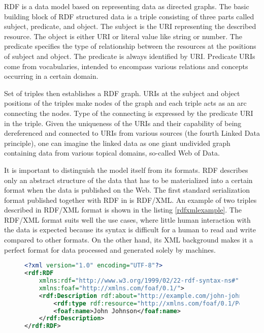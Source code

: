 RDF is a data model based on representing data as directed graphs. The basic building block of RDF structured data is a triple consisting of three parts called subject, predicate, and object. The subject is the URI representing the described resource. The object is either URI or literal value like string or number. The predicate specifies the type of relationship between the resources at the positions of subject and object. The predicate is always identified by URI. Predicate URIs come from vocabularies, intended to encompass various relations and concepts occurring in a certain domain.

Set of triples then establishes a RDF graph. URIs at the subject and object positions of the triples make nodes of the graph and each triple acts as an arc connecting the nodes. Type of the connecting is expressed by the predicate URI in the triple. Given the uniqueness of the URIs and their capability of being dereferenced and connected to URIs from various sources (the fourth Linked Data principle), one can imagine the linked data as one giant undivided graph containing data from various topical domains, so-called Web of Data.

It is important to distinguish the model itself from its formats. RDF describes only an abstract structure of the data that has to be materialized into a certain format when the data is published on the Web. The first standard serialization format published together with RDF in \cite{rdfPrimer2004} is RDF/XML. An example of two triples described in RDF/XML format is shown in the listing \ref{rdfxmlexample}. The RDF/XML format suits well the use cases, where little human interaction with the data is expected because its syntax is difficult for a human to read and write compared to other formats. On the other hand, its XML background makes it a perfect format for data processed and generated solely by machines.

\begin{figure}[h]
\begin{lstlisting}[language = XML, caption={Example of RDF data described in RDF/XML format}, label={rdfxmlexample},captionpos=b escapeinside={(*@}{@*)}]
<?xml version="1.0" encoding="UTF-8"?>
<rdf:RDF
    xmlns:rdf="http://www.w3.org/1999/02/22-rdf-syntax-ns#"
    xmlns:foaf="http://xmlns.com/foaf/0.1/">
    <rdf:Description rdf:about="http://example.com/john-johnson">
        <rdf:type rdf:resource="http://xmlns.com/foaf/0.1/Person"/>
        <foaf:name>John Johnson</foaf:name>
    </rdf:Description>
</rdf:RDF>
\end{lstlisting}
\end{figure}

